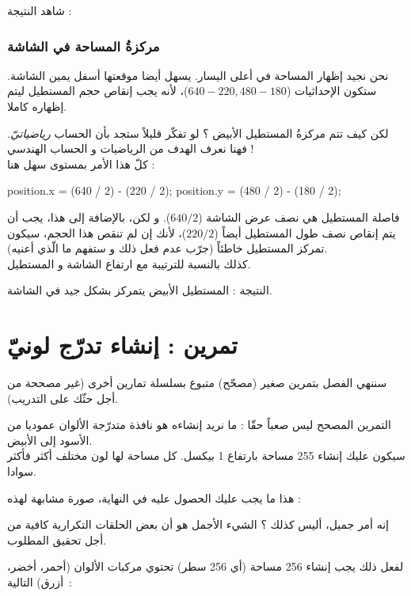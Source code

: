 شاهد النتيجة :


\subsubsection{مركزةُ المساحة في الشاشة}

نحن نجيد إظهار المساحة في أعلى اليسار. يسهل أيضا موقعتها أسفل يمين الشاشة. ستكون الإحداثيات
\mbox{($640 - 220, 480 - 180$)}،
لأنه يجب إنقاص حجم المستطيل ليتم إظهاره كاملا. 

لكن كيف تتم مركزةُ المستطيل الأبيض ؟ لو تفكّر قليلاً ستجد بأن الحساب
\textit{رياضياتيّ}.
فهنا نعرف الهدف من الرياضيات و الحساب الهندسي !\\
كلّ هذا الأمر بمستوى سهل هنا :

\begin{Csource}
position.x = (640 / 2) - (220 / 2);
position.y = (480 / 2) - (180 / 2);
\end{Csource}

فاصلة المستطيل هي نصف عرض الشاشة
($640 / 2$).
و لكن، بالإضافة إلى هذا، يجب أن يتم إنقاص نصف طول المستطيل أيضاً 
($220 / 2$)،
لأنك إن لم تنقص هذا الحجم، سيكون تمركز المستطيل خاطئاً (جرّب عدم فعل ذلك و ستفهم ما الّذي أعنيه).\\
كذلك بالنسبة للترتيبة مع ارتفاع الشاشة و المستطيل.

النتيجة : المستطيل الأبيض يتمركز بشكل جيد في الشاشة.


\section{تمرين : إنشاء تدرّج لونيّ}

سننهي الفصل بتمرين صغير (مصحّح) متبوع بسلسلة تمارين أخرى (غير مصححة من أجل حثّك على التدريب).

التمرين المصحح ليس صعباً حقّا : ما نريد إنشاءه هو نافذة متدرّجة الألوان عموديا من الأسود إلى الأبيض.\\
سيكون عليك إنشاء 255 مساحة بارتفاع 1 بيكسل. كل مساحة لها لون مختلف أكثر فأكثر سوادا.

هذا ما يجب عليك الحصول عليه في النهاية، صورة مشابهة لهذه :


 إنه أمر جميل، أليس كذلك ؟ الشيء الأجمل هو أن بعض الحلقات التكرارية كافية من أجل تحقيق المطلوب.
 
لفعل ذلك يجب إنشاء 256 مساحة (أي 256 سطر) تحتوي مركبات الألوان (أحمر، أخضر، أزرق) التالية~:

